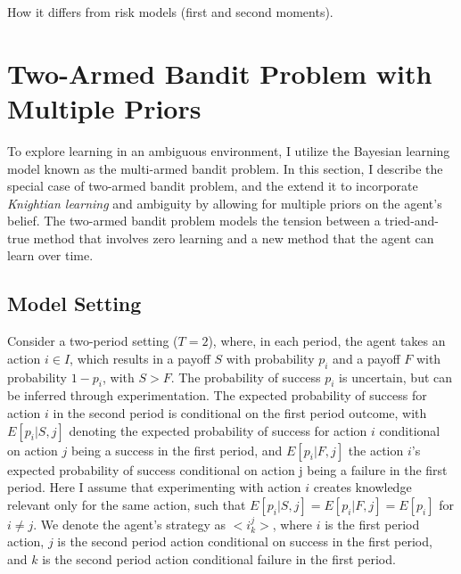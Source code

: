 \documentclass[11pt]{article} %
\theoremstyle{exampstyle}
\begin{document}
How it differs from risk models (first and second moments). 


\section{Two-Armed Bandit Problem with Multiple Priors}
\label{bandit}
To explore learning in an ambiguous environment, I utilize the Bayesian learning model known as the multi-armed bandit problem. In this section, I describe the special case of two-armed bandit problem, and the extend it to incorporate \emph{Knightian learning} and ambiguity by allowing for multiple priors on the agent's belief. The two-armed bandit problem models the tension between a tried-and-true method that involves zero learning and a new method that the agent can learn over time. 

\subsection{Model Setting}

Consider a two-period setting ($T=2$), where, in each period, the agent takes an action $ i \in I$, which results in a payoff $S$ with probability $p_i$ and a payoff $F$ with probability $1-p_i$, with $S>F$. The probability of success $p_i$ is uncertain, but can be inferred through experimentation. The expected probability of success for action $i$ in the second period is conditional on the first period outcome, with $E[p_i | S, j]$ denoting the expected probability of success for action $i$ conditional on action $j$ being a success in the first period, and $E[p_i | F, j]$ the action $i$'s expected probability of success conditional on action j being a failure in the first period. Here I assume that experimenting with action $i$ creates knowledge relevant only for the same action, such that $E[p_i | S, j] = E[p_i | F, j] = E[p_i]$ for $i \neq j$. We denote the agent's strategy as $<\!i^j_k\!>$, where $i$ is the first period action, $j$ is the second period action conditional on success in the first period, and $k$ is the second period action conditional failure in the first period. 
\end{document}

